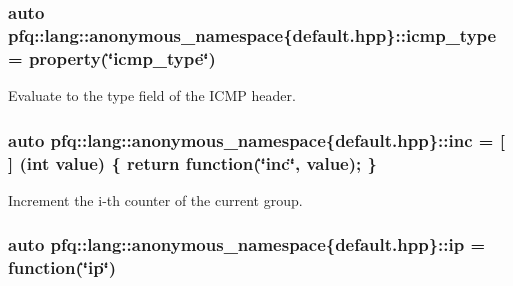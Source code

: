 \subsubsection[{\texorpdfstring{icmp\+\_\+type}{icmp_type}}]{\setlength{\rightskip}{0pt plus 5cm}auto pfq\+::lang\+::anonymous\+\_\+namespace\{default.\+hpp\}\+::icmp\+\_\+type = {\bf property}(\char`\"{}icmp\+\_\+type\char`\"{})}\hypertarget{namespacepfq_1_1lang_1_1anonymous__namespace_02default_8hpp_03_a0c15abbec8753be8bb160633f697ed4b}{}\label{namespacepfq_1_1lang_1_1anonymous__namespace_02default_8hpp_03_a0c15abbec8753be8bb160633f697ed4b}


Evaluate to the {\ttfamily type} field of the I\+C\+MP header. 

\subsubsection[{\texorpdfstring{inc}{inc}}]{\setlength{\rightskip}{0pt plus 5cm}auto pfq\+::lang\+::anonymous\+\_\+namespace\{default.\+hpp\}\+::inc = \mbox{[}$\,$\mbox{]} (int value) \{ return {\bf function}(\char`\"{}inc\char`\"{}, value); \}}\hypertarget{namespacepfq_1_1lang_1_1anonymous__namespace_02default_8hpp_03_acc7d3a4cca5eb30ff5456e19c613b174}{}\label{namespacepfq_1_1lang_1_1anonymous__namespace_02default_8hpp_03_acc7d3a4cca5eb30ff5456e19c613b174}


Increment the i-\/th counter of the current group. 

\subsubsection[{\texorpdfstring{ip}{ip}}]{\setlength{\rightskip}{0pt plus 5cm}auto pfq\+::lang\+::anonymous\+\_\+namespace\{default.\+hpp\}\+::ip = {\bf function}(\char`\"{}ip\char`\"{})}\hypertarget{namespacepfq_1_1lang_1_1anonymous__namespace_02default_8hpp_03_a738d1b52bf88feb4f7b1a17b97cdc8df}{}\label{namespacepfq_1_1lang_1_1anonymous__namespace_02default_8hpp_03_a738d1b52bf88feb4f7b1a17b97cdc8df}


